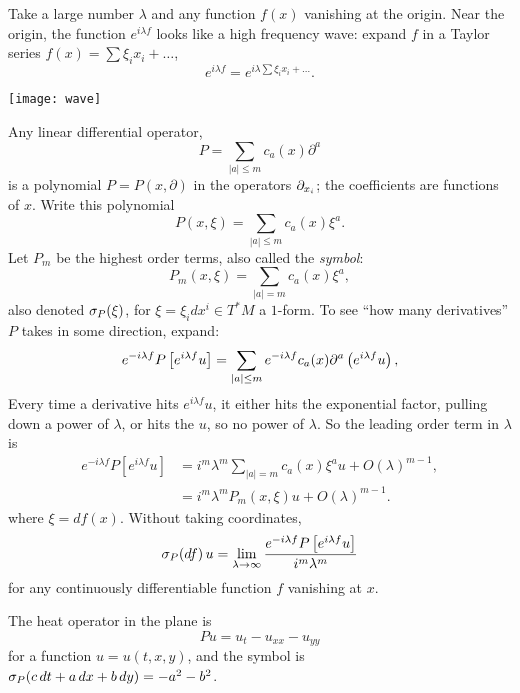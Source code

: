Take a large number \(\lambda\) and any function \(f(x)\) vanishing at the origin.
Near the origin, the function \(e^{i\lambda f}\) looks like a high frequency wave: expand \(f\) in a Taylor series \(f(x)=\sum \xi_i x_i + \dots\),
\[
e^{i\lambda f} = e^{i \lambda \sum \xi_i x_i + \dots}.
\]
\begin{center}
\texttt{[image: wave]}
\end{center}
Any linear differential operator,
\[
P=\sum_{|a|\le m} c_a(x) \partial^a
\]
is a polynomial \(P=P(x,\partial)\) in the operators \(\partial_{x_i}\); the coefficients are functions of \(x\).
Write this polynomial
\[
P(x,\xi)=
\sum_{|a|\le m} c_a(x) \xi^a.
\]
Let \(P_m\) be the highest order terms, also called the \emph{symbol}:
\[
P_m(x,\xi)=\sum_{|a|=m} c_a(x) \xi^a,
\]
also denoted \(\opsymbol[P]{\xi}\), for \(\xi=\xi_i dx^i \in T^* M\) a \(1\)-form.
To see ``how many derivatives'' \(P\) takes in some direction, expand:
\[
e^{-i\lambda f}P\left[e^{i \lambda f}u\right]
=
\sum_{|a|\le m} e^{-i\lambda f}c_a(x) \partial^a \left(e^{i\lambda f}u\right),
\]
Every time a derivative hits \(e^{i\lambda f}u\), it either hits the exponential factor, pulling down a power of \(\lambda\), or hits the \(u\), so no power of \(\lambda\).
So the leading order term in \(\lambda\) is
\begin{align*}
e^{-i\lambda f}P\left[e^{i \lambda f}u\right]
&=i^m \lambda^m \sum_{|a|=m} c_a(x) \xi^a u + O(\lambda)^{m-1},
\\
&=i^m\lambda^mP_m(x,\xi)u+O(\lambda)^{m-1}.
\end{align*}
where \(\xi=df(x)\).
Without taking coordinates,
\[
\opsymbol[P]{df}u=\lim_{\lambda \to \infty} \frac{e^{-i\lambda f} P \left[e^{i\lambda f}u\right]}{i^m\lambda^m}
\]
for any continuously differentiable function \(f\) vanishing at \(x\).
\begin{example}
The heat operator in the plane is
\[
Pu=u_t-u_{xx}-u_{yy}
\]
for a function \(u=u(t,x,y)\), and the symbol is \(\opsymbol[P]{c \, dt + a \, dx + b \, dy}=-a^2-b^2\).
\end{example}

